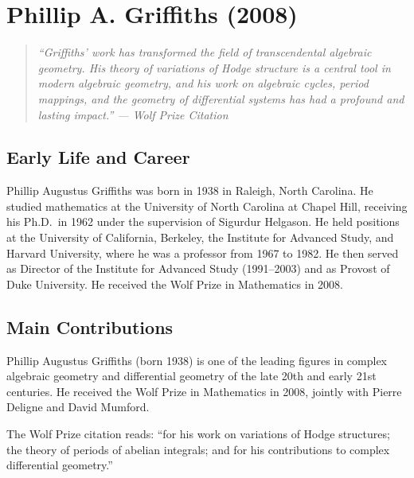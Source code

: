 \providecommand{\Gr}{\operatorname{Gr}}

\chapter{Phillip A. Griffiths (2008)}

\begin{quote}
\it ``Griffiths' work has transformed the field of transcendental algebraic geometry. His theory of variations of Hodge structure is a central tool in modern algebraic geometry, and his work on algebraic cycles, period mappings, and the geometry of differential systems has had a profound and lasting impact.'' --- Wolf Prize Citation
\end{quote}

\section{Early Life and Career}

Phillip Augustus Griffiths was born in 1938 in Raleigh, North Carolina. He studied mathematics at the University of North Carolina at Chapel Hill, receiving his Ph.D.\ in 1962 under the supervision of Sigurdur Helgason. He held positions at the University of California, Berkeley, the Institute for Advanced Study, and Harvard University, where he was a professor from 1967 to 1982. He then served as Director of the Institute for Advanced Study (1991--2003) and as Provost of Duke University. He received the Wolf Prize in Mathematics in 2008.

\section{Main Contributions}

Phillip Augustus Griffiths (born 1938) is one of the leading figures in complex algebraic geometry and differential geometry of the late 20th and early 21st centuries. He received the Wolf Prize in Mathematics in 2008, jointly with Pierre Deligne and David Mumford.

The Wolf Prize citation reads: ``for his work on variations of Hodge structures; the theory of periods of abelian integrals; and for his contributions to complex differential geometry.''

